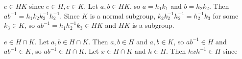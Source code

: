 \documentclass{hmwk}
\begin{document}
\pre $e \in HK$ since $e \in H, e \in K$. Let $a, b \in HK$, so $a = h_1k_1$ and $b = h_2k_2$. Then $ab^{-1} = h_1k_2k_2^{-1}h_2^{-1}$. Since $K$ is a normal subgroup, $k_2k_2^{-1}h_2^{-1} = h_2^{-1}k_3$ for some $k_3 \in K$, so $ab^{-1} = h_1h_2^{-1}k_3 \in HK$ and $HK$ is a subgroup. 

\pre $e \in H \cap K$. Let $a, b \in H \cap K$. Then $a, b \in H$ and $a, b \in K$, so $ab^{-1} \in H$ and $ab^{-1} \in K$, so $ab^{-1} \in H \cap K$. Let $x \in H \cap K$ and $h \in H$. Then $hxh^{-1} \in H$ since 
\end{document}
